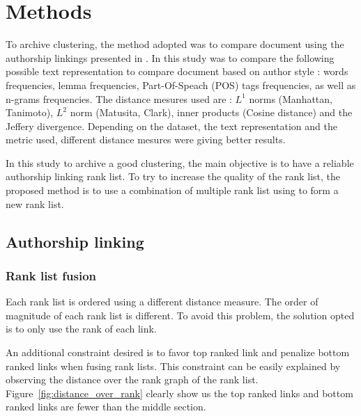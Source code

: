\section{Methods}

To archive clustering, the method adopted was to compare document using the authorship linkings presented in \cite{kocher_verification}.
In this study was to compare the following possible text representation to compare document based on author style : words frequencies, lemma frequencies, Part-Of-Speach (POS) tags frequencies, as well as n-grams frequencies.
The distance mesures used are : $L^1$ norms (Manhattan, Tanimoto), $L^2$ norm (Matusita, Clark), inner products (Cosine distance) and the Jeffery divergence.
Depending on the dataset, the text representation and the metric used, different distance mesures were giving better results.

In this study to archive a good clustering, the main objective is to have a reliable authorship linking rank list.
To try to increase the quality of the rank list, the proposed method is to use a combination of multiple rank list using to form a new rank list.

\subsection{Authorship linking}

\subsubsection{Rank list fusion}

Each rank list is ordered using a different distance measure.
The order of magnitude of each rank list is different.
To avoid this problem, the solution opted is to only use the rank of each link.

An additional constraint desired is to favor top ranked link and penalize bottom ranked links when fusing rank lists.
This constraint can be easily explained by observing the distance over the rank graph of the rank list.
Figure~\ref{fig:distance_over_rank} clearly show us the top ranked links and bottom ranked links are fewer than the middle section.

